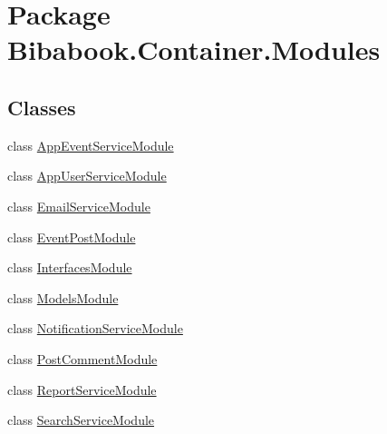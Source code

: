 \hypertarget{namespace_bibabook_1_1_container_1_1_modules}{}\section{Package Bibabook.\+Container.\+Modules}
\label{namespace_bibabook_1_1_container_1_1_modules}
\subsection*{Classes}
\begin{DoxyCompactItemize}
\item 
class \hyperlink{class_bibabook_1_1_container_1_1_modules_1_1_app_event_service_module}{App\+Event\+Service\+Module}
\item 
class \hyperlink{class_bibabook_1_1_container_1_1_modules_1_1_app_user_service_module}{App\+User\+Service\+Module}
\item 
class \hyperlink{class_bibabook_1_1_container_1_1_modules_1_1_email_service_module}{Email\+Service\+Module}
\item 
class \hyperlink{class_bibabook_1_1_container_1_1_modules_1_1_event_post_module}{Event\+Post\+Module}
\item 
class \hyperlink{class_bibabook_1_1_container_1_1_modules_1_1_interfaces_module}{Interfaces\+Module}
\item 
class \hyperlink{class_bibabook_1_1_container_1_1_modules_1_1_models_module}{Models\+Module}
\item 
class \hyperlink{class_bibabook_1_1_container_1_1_modules_1_1_notification_service_module}{Notification\+Service\+Module}
\item 
class \hyperlink{class_bibabook_1_1_container_1_1_modules_1_1_post_comment_module}{Post\+Comment\+Module}
\item 
class \hyperlink{class_bibabook_1_1_container_1_1_modules_1_1_report_service_module}{Report\+Service\+Module}
\item 
class \hyperlink{class_bibabook_1_1_container_1_1_modules_1_1_search_service_module}{Search\+Service\+Module}
\end{DoxyCompactItemize}
